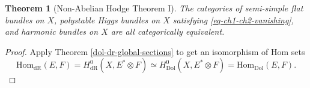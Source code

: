 \documentclass[letterpaper, 12pt]{article}
\newcommand{\Hom}{\text{Hom}}
\newtheorem{theorem}{Theorem}
\theoremstyle{definition}
\begin{document}
\begin{theorem}[Non-Abelian Hodge Theorem I]
    The categories of semi-simple flat bundles on $X$, polystable Higgs bundles on $X$ satisfying \eqref{eq-ch1-ch2-vanishing}, and harmonic bundles on $X$ are all categorically equivalent.
\end{theorem}
\begin{proof}
Apply Theorem \ref{dol-dr-global-sections} to get an isomorphism of Hom sets
\begin{equation*}
    \Hom_{\text{dR}}(E, F) = H^0_{\text{dR}}(X, E^* \otimes F) \simeq 
    H^0_{\text{Dol}}(X, E^* \otimes F) = \Hom_{\text{Dol}}(E, F).
\end{equation*}
\end{proof}
\end{document}
